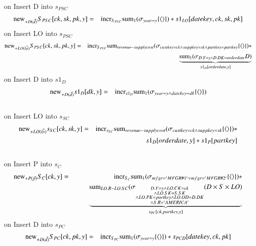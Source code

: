 on Insert D into $s_{PSC}$
\begin{eqnarray}
\mathrm{new}_{+D(\vec{d})} S_{PSC} [ck, sk, pk, y] &=& \mathrm{incr}_{S_{PSC}}
\mathrm{sum}_{1} (\sigma_{year = y} \{{\langle\rangle}\}) * s1_{LO} [datekey, ck, sk, pk]
\end{eqnarray}
on Insert LO into $s_{PSC}$
\begin{eqnarray}
\mathrm{new}_{+LO(\vec{lo})} S_{PSC} [ck, sk, pk, y] &=& \mathrm{incr}_{S_{PSC}}
\mathrm{sum}_{revenue-supplycost} (\sigma_{custkey = ck \wedge suppkey = sk \wedge partkey = partkey} \{{\langle\rangle}\}) *
\\\nonumber&&\qquad \underbrace{\mathrm{sum}_{1} (\sigma_{D.Y = y \wedge D.DK = orderdate} D)}_{s1_{D}[orderdate, y]}
\end{eqnarray}
on Insert D into $s1_{D}$
\begin{eqnarray}
\mathrm{new}_{+D(\vec{d})} s1_{D} [dk, y] &=&
\mathrm{incr}_{s1_{D}} \mathrm{sum}_{1} (\sigma_{year = y \wedge datekey = dk} \{{\langle\rangle}\})
\end{eqnarray}
\\
on Insert LO into $s_{SC}$
\begin{eqnarray}
\mathrm{new}_{+LO(\vec{lo})} s_{SC} [ck, sk, y] &=& \mathrm{incr}_{s_{SC}}
\mathrm{sum}_{revenue-supplycost} (\sigma_{custkey = ck \wedge suppkey = sk} \{{\langle\rangle}\}) * 
\\\nonumber&&\qquad  s1_{D}[orderdate, y] * s1_{P}[partkey]
\end{eqnarray}
\\
on Insert P into $s_C$
\begin{eqnarray}
\mathrm{new}_{+P(\vec{p})} S_{C} [ck, y] &=& \mathrm{incr}_{S_{C}}
\mathrm{sum}_{1} (\sigma_{mfgr = 'MFGR\#1' \vee mfgr = 'MFGR\#2'} \{{\langle\rangle}\}) * 
\\\nonumber&&\qquad \underbrace{\mathrm{sum}_{LO.R - LO.SC} (\sigma_{\substack{ D.Y = y \wedge  LO.CK = ck \\\wedge LO.SK = S.SK \\\wedge LO.PK = partkey \wedge LO.OD = D.DK \\\wedge S.R = 'AMERICA' }} ( D \times S \times LO) }_{s_{PC} [ck, partkey, y]}
\end{eqnarray}
on Insert D into $s_{PC}$
\begin{eqnarray}
\mathrm{new}_{+D(\vec{d})} S_{PC} [ck, pk, y] &=& \mathrm{incr}_{S_{PC}}
\mathrm{sum}_{1} (\sigma_{year = y} \{{\langle\rangle}\}) * s_{PCD} [datekey, ck, pk]
\end{eqnarray}
